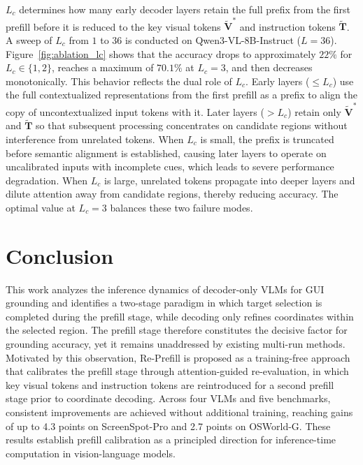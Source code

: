 \documentclass{article}
\begin{document}
$L_c$ determines how many early decoder layers retain the full prefix from the first prefill before it is reduced to the key visual tokens $\tilde{\mathbf{V}}^{*}$ and instruction tokens $\tilde{\mathbf{T}}$.
A sweep of $L_c$ from $1$ to $36$ is conducted on Qwen3-VL-8B-Instruct ($L = 36$).
Figure~\ref{fig:ablation_lc} shows that the accuracy drops to approximately $22\%$ for $L_c \in \{1,2\}$, reaches a maximum of $70.1\%$ at $L_c = 3$, and then decreases monotonically.
This behavior reflects the dual role of $L_c$. Early layers ($\le L_c$) use the full contextualized representations from the first prefill as a prefix to align the copy of uncontextualized input tokens with it. Later layers ($> L_c$) retain only $\tilde{\mathbf{V}}^{*}$ and $\tilde{\mathbf{T}}$ so that subsequent processing concentrates on candidate regions without interference from unrelated tokens.
When $L_c$ is small, the prefix is truncated before semantic alignment is established, causing later layers to operate on uncalibrated inputs with incomplete cues, which leads to severe performance degradation.
When $L_c$ is large, unrelated tokens propagate into deeper layers and dilute attention away from candidate regions, thereby reducing accuracy.
The optimal value at $L_c = 3$ balances these two failure modes.

\section{Conclusion}
This work analyzes the inference dynamics of decoder-only VLMs for GUI grounding and identifies a two-stage paradigm in which target selection is completed during the prefill stage, while decoding only refines coordinates within the selected region.
The prefill stage therefore constitutes the decisive factor for grounding accuracy, yet it remains unaddressed by existing multi-run methods.
Motivated by this observation, Re-Prefill is proposed as a training-free approach that calibrates the prefill stage through attention-guided re-evaluation, in which key visual tokens and instruction tokens are reintroduced for a second prefill stage prior to coordinate decoding.
Across four VLMs and five benchmarks, consistent improvements are achieved without additional training, reaching gains of up to 4.3 points on ScreenSpot-Pro and 2.7 points on OSWorld-G.
These results establish prefill calibration as a principled direction for inference-time computation in vision-language models.
\end{document}
